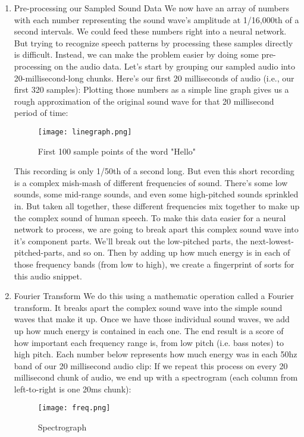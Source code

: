 \documentclass[12pt,a4paper]{article}
\begin{document}
\begin{enumerate}
\item Pre-processing our Sampled Sound Data
We now have an array of numbers with each number representing the sound wave’s amplitude at 1/16,000th of a second intervals.
We could feed these numbers right into a neural network. But trying to recognize speech patterns by processing these samples directly is difficult. Instead, we can make the problem easier by doing some pre-processing on the audio data.
Let’s start by grouping our sampled audio into 20-millisecond-long chunks. Here’s our first 20 milliseconds of audio (i.e., our first 320 samples):
Plotting those numbers as a simple line graph gives us a rough approximation of the original sound wave for that 20 millisecond period of time:

\begin{figure}[h]
	\centering
	\texttt{[image: linegraph.png]}
	\caption{First 100 sample points of the word "Hello"}
\end{figure}

This recording is only 1/50th of a second long. But even this short recording is a complex mish-mash of different frequencies of sound. There’s some low sounds, some mid-range sounds, and even some high-pitched sounds sprinkled in. But taken all together, these different frequencies mix together to make up the complex sound of human speech.
To make this data easier for a neural network to process, we are going to break apart this complex sound wave into it’s component parts. We’ll break out the low-pitched parts, the next-lowest-pitched-parts, and so on. Then by adding up how much energy is in each of those frequency bands (from low to high), we create a fingerprint of sorts for this audio snippet.

\item Fourier Transform
We do this using a mathematic operation called a Fourier transform. It breaks apart the complex sound wave into the simple sound waves that make it up. Once we have those individual sound waves, we add up how much energy is contained in each one.
The end result is a score of how important each frequency range is, from low pitch (i.e. bass notes) to high pitch. Each number below represents how much energy was in each 50hz band of our 20 millisecond audio clip:
If we repeat this process on every 20 millisecond chunk of audio, we end up with a spectrogram (each column from left-to-right is one 20ms chunk):

\newpage

\begin{figure}[h]
	\centering
	\texttt{[image: freq.png]}
	\caption{Spectrograph}
\end{figure}


\end{enumerate}
\end{document}
